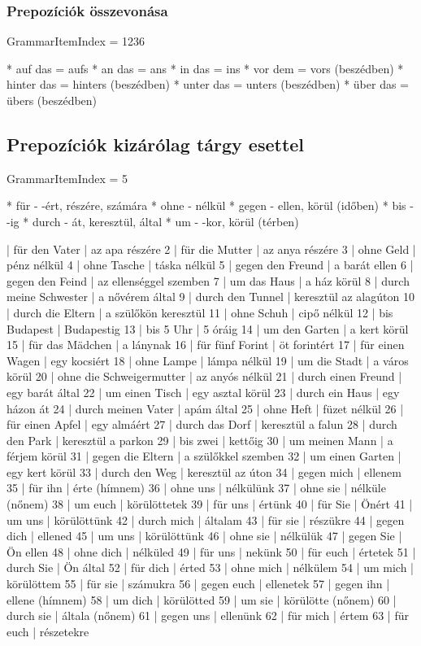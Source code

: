 \documentclass{article}
\newenvironment{desc}{\verbatim}{\endverbatim}
\newenvironment{exmp}{\verbatim}{\endverbatim}
\begin{document}
\subsubsection{Prepozíciók összevonása}

GrammarItemIndex = 1236

\begin{desc}
* auf das = aufs
* an das = ans
* in das = ins
* vor dem = vors (beszédben)
* hinter das = hinters (beszédben)
* unter das = unters (beszédben)
* über das = übers (beszédben)
\end{desc}

\subsection{Prepozíciók kizárólag tárgy esettel}

GrammarItemIndex = 5

\begin{desc}
* für - -ért, részére, számára
* ohne - nélkül
* gegen - ellen, körül (időben)
* bis - -ig
* durch - át, keresztül, által
* um - -kor, körül (térben)
\end{desc}

\begin{exmp}
1 | für den Vater | az apa részére
2 | für die Mutter | az anya részére
3 | ohne Geld | pénz nélkül
4 | ohne Tasche | táska nélkül
5 | gegen den Freund | a barát ellen
6 | gegen den Feind | az ellenséggel szemben
7 | um das Haus | a ház körül
8 | durch meine Schwester | a nővérem által
9 | durch den Tunnel | keresztül az alagúton
10 | durch die Eltern | a szülőkön keresztül
11 | ohne Schuh | cipő nélkül
12 | bis Budapest | Budapestig
13 | bis 5 Uhr | 5 óráig
14 | um den Garten | a kert körül
15 | für das Mädchen | a lánynak
16 | für fünf Forint | öt forintért
17 | für einen Wagen | egy kocsiért
18 | ohne Lampe | lámpa nélkül
19 | um die Stadt | a város körül
20 | ohne die Schweigermutter | az anyós nélkül
21 | durch einen Freund | egy barát által
22 | um einen Tisch | egy asztal körül
23 | durch ein Haus | egy házon át
24 | durch meinen Vater | apám által
25 | ohne Heft | füzet nélkül
26 | für einen Apfel | egy almáért
27 | durch das Dorf | keresztül a falun
28 | durch den Park | keresztül a parkon
29 | bis zwei | kettőig
30 | um meinen Mann | a férjem körül
31 | gegen die Eltern | a szülőkkel szemben
32 | um einen Garten | egy kert körül
33 | durch den Weg | keresztül az úton
34 | gegen mich | ellenem
35 | für ihn | érte (hímnem)
36 | ohne uns | nélkülünk
37 | ohne sie | nélküle (nőnem)
38 | um euch | körülöttetek
39 | für uns | értünk
40 | für Sie | Önért
41 | um uns | körülöttünk
42 | durch mich | általam
43 | für sie | részükre
44 | gegen dich | ellened
45 | um uns | körülöttünk
46 | ohne sie | nélkülük
47 | gegen Sie | Ön ellen
48 | ohne dich | nélküled
49 | für uns | nekünk
50 | für euch | értetek
51 | durch Sie | Ön által
52 | für dich | érted
53 | ohne mich | nélkülem
54 | um mich | körülöttem
55 | für sie | számukra
56 | gegen euch | ellenetek
57 | gegen ihn | ellene (hímnem)
58 | um dich | körülötted
59 | um sie | körülötte (nőnem)
60 | durch sie | általa (nőnem)
61 | gegen uns | ellenünk
62 | für mich | értem
63 | für euch | részetekre
\end{exmp}
\end{document}
